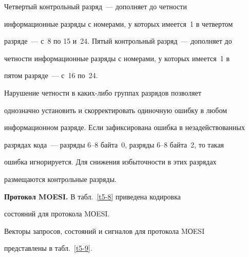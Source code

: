       Четвертый контрольный разряд~--- дополняет до четности 


информационные разряды с номерами, у которых имеется~1 в четвертом 


разряде~--- с~8 по 15 и~24. Пятый контрольный разряд~--- дополняет до 


четности информационные разряды с номерами, у которых имеется~1 в 


пятом разряде~--- с~16 по~24.


      


      Нарушение четности в каких-либо группах разрядов позволяет 


однозначно установить и скорректировать одиночную ошибку в любом 


информационном разряде. Если зафиксирована ошибка в незадействованных 


разрядах кода~--- разряды 6--8 байта~0, разряды 6--8 байта~2, то такая 


ошибка игнорируется. Для снижения избыточности в этих разрядах 


размещаются контрольные разряды.


      


      \textbf{Протокол MOESI.} В табл.~\ref{t5-8}  приведена кодировка 


состояний для протокола MОESI.











Векторы запросов, состояний и сигналов для протокола MОESI 


представлены в табл.~\ref{t5-9}.





